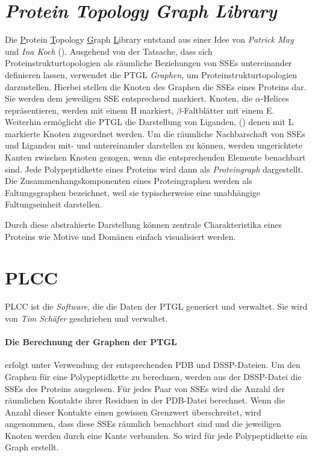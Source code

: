 \documentclass{report}
\begin{document}




\section{\textit{Protein Topology Graph Library}}


Die \underline{P}rotein \underline{T}opology \underline{G}raph \underline{L}ibrary entstand aus einer Idee von \textit{Patrick May} und \textit{Ina Koch} (\cite{ptgl1}). Ausgehend von der Tatsache, dass sich Proteinstrukturtopologien als r\"aumliche Beziehungen von SSEs untereinander definieren lassen, verwendet die PTGL \emph{Graphen}, um Proteinstrukturtopologien darzustellen.
Hierbei stellen die Knoten des Graphen die SSEs eines Proteins dar. Sie werden dem jeweiligen SSE entsprechend markiert. Knoten, die $\alpha$-Helices repr\"asentieren, werden mit einem H markiert, $\beta$-Faltbl\"atter mit einem E. Weiterhin erm\"oglicht die PTGL die Darstellung von Liganden, (\cite{vplg}) denen mit L markierte Knoten zugeordnet werden. Um die r\"aumliche Nachbarschaft von SSEs und Liganden mit- und untereinander darstellen zu k\"onnen, werden ungerichtete Kanten zwischen Knoten gezogen, wenn die entsprechenden Elemente benachbart sind. Jede Polypeptidkette eines Proteins wird dann als \emph{Proteingraph} dargestellt. Die Zusammenhangskomponenten eines Proteingraphen werden als Faltungsgraphen bezeichnet, weil sie typischerweise eine unabh\"angige Faltungseinheit darstellen.

Durch diese abstrahierte Darstellung k\"onnen zentrale Charakteristika eines Proteins wie Motive und Dom\"anen einfach visualisiert werden.


\section{PLCC}

PLCC ist die \textit{Software}, die die Daten der PTGL generiert und verwaltet. Sie wird von \textit{Tim Sch\"afer} geschrieben und verwaltet.


\paragraph{Die Berechnung der Graphen der PTGL}

erfolgt unter Verwendung der entsprechenden PDB und DSSP-Dateien. Um den Graphen f\"ur eine Polypeptidkette zu berechnen, werden aus der DSSP-Datei die SSEs des Proteins ausgelesen. F\"ur jedes Paar von SSEs wird die Anzahl der r\"aumlichen Kontakte ihrer Residuen in der PDB-Datei berechnet. Wenn die Anzahl dieser Kontakte einen gewissen Grenzwert \"uberschreitet, wird angenommen, dass diese SSEs r\"aumlich benachbart sind und die jeweiligen Knoten werden durch eine Kante verbunden. So wird f\"ur jede Polypeptidkette ein Graph erstellt.
\end{document}
